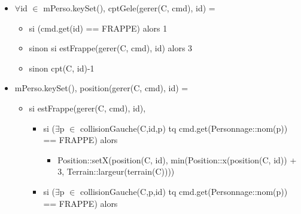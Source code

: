 \documentclass[11pt]{article}
\begin{document}
\begin{itemize}
\item $\forall$id $\in$ mPerso.keySet(), cptGele(gerer(C, cmd), id) =\\
\label{sec-1.7.3.5}

\begin{itemize}

\item si (cmd.get(id) == FRAPPE) alors 1\\
\label{sec-1.7.3.5.1}


\item sinon si estFrappe(gerer(C, cmd), id) alors 3\\
\label{sec-1.7.3.5.2}


\item sinon cpt(C, id)-1\\
\label{sec-1.7.3.5.3}


\end{itemize} %

\item mPerso.keySet(), position(gerer(C, cmd), id) =\\
\label{sec-1.7.3.6}

\begin{itemize}

\item si estFrappe(gerer(C, cmd), id),\\
\label{sec-1.7.3.6.1}

\begin{itemize}

\item si ($\exists$p $\in$ collisionGauche(C,id,p) tq cmd.get(Personnage::nom(p)) == FRAPPE) alors\\
\label{sec-1.7.3.6.1.1}

\begin{itemize}

\item Position::setX(position(C, id), min(Position::x(position(C, id)) + 3, Terrain::largeur(terrain(C))))\\
\label{sec-1.7.3.6.1.1.1}

\end{itemize} %

\item si ($\exists$p $\in$ collisionGauche(C,p,id) tq cmd.get(Personnage::nom(p)) == FRAPPE) alors\\
\label{sec-1.7.3.6.1.2}

\begin{itemize}


\end{itemize}
\end{itemize}
\end{itemize}
\end{itemize}
\end{document}
